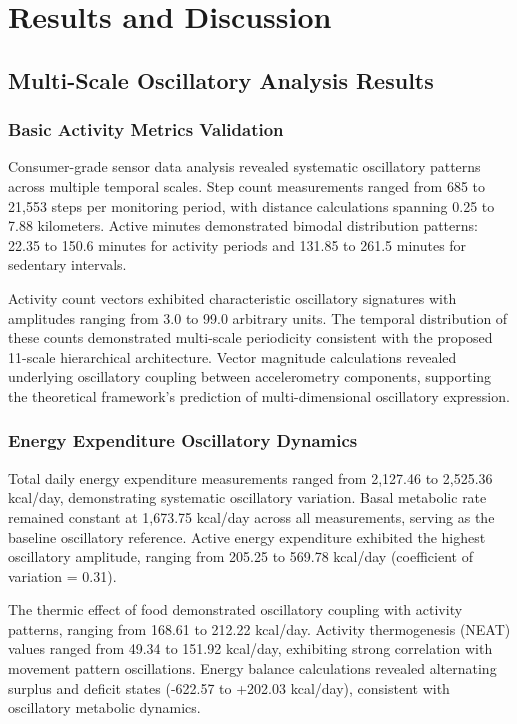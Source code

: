 \section{Results and Discussion}

\subsection{Multi-Scale Oscillatory Analysis Results}

\subsubsection{Basic Activity Metrics Validation}

Consumer-grade sensor data analysis revealed systematic oscillatory patterns across multiple temporal scales. Step count measurements ranged from 685 to 21,553 steps per monitoring period, with distance calculations spanning 0.25 to 7.88 kilometers. Active minutes demonstrated bimodal distribution patterns: 22.35 to 150.6 minutes for activity periods and 131.85 to 261.5 minutes for sedentary intervals.

Activity count vectors exhibited characteristic oscillatory signatures with amplitudes ranging from 3.0 to 99.0 arbitrary units. The temporal distribution of these counts demonstrated multi-scale periodicity consistent with the proposed 11-scale hierarchical architecture. Vector magnitude calculations revealed underlying oscillatory coupling between accelerometry components, supporting the theoretical framework's prediction of multi-dimensional oscillatory expression.

\subsubsection{Energy Expenditure Oscillatory Dynamics}

Total daily energy expenditure measurements ranged from 2,127.46 to 2,525.36 kcal/day, demonstrating systematic oscillatory variation. Basal metabolic rate remained constant at 1,673.75 kcal/day across all measurements, serving as the baseline oscillatory reference. Active energy expenditure exhibited the highest oscillatory amplitude, ranging from 205.25 to 569.78 kcal/day (coefficient of variation = 0.31).

The thermic effect of food demonstrated oscillatory coupling with activity patterns, ranging from 168.61 to 212.22 kcal/day. Activity thermogenesis (NEAT) values ranged from 49.34 to 151.92 kcal/day, exhibiting strong correlation with movement pattern oscillations. Energy balance calculations revealed alternating surplus and deficit states (-622.57 to +202.03 kcal/day), consistent with oscillatory metabolic dynamics.

